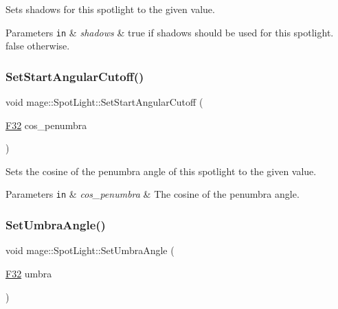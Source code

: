 Sets shadows for this spotlight to the given value.


\begin{DoxyParams}[1]{Parameters}
\mbox{\tt in}  & {\em shadows} & {\ttfamily true} if shadows should be used for this spotlight. {\ttfamily false} otherwise. \\
\hline
\end{DoxyParams}
\hypertarget{classmage_1_1_spot_light_afae0adbfe0da1a897696a90294c93aef}{}\label{classmage_1_1_spot_light_afae0adbfe0da1a897696a90294c93aef} 
\subsubsection{\texorpdfstring{Set\+Start\+Angular\+Cutoff()}{SetStartAngularCutoff()}}
{\footnotesize\ttfamily void mage\+::\+Spot\+Light\+::\+Set\+Start\+Angular\+Cutoff (\begin{DoxyParamCaption}\item[{\hyperlink{namespacemage_aa97e833b45f06d60a0a9c4fc22ae02c0}{F32}}]{cos\+\_\+penumbra }\end{DoxyParamCaption})\hspace{0.3cm}{\ttfamily [noexcept]}}

Sets the cosine of the penumbra angle of this spotlight to the given value.


\begin{DoxyParams}[1]{Parameters}
\mbox{\tt in}  & {\em cos\+\_\+penumbra} & The cosine of the penumbra angle. \\
\hline
\end{DoxyParams}
\hypertarget{classmage_1_1_spot_light_aab2685ef31177d7e40ef964fb9bc0e24}{}\label{classmage_1_1_spot_light_aab2685ef31177d7e40ef964fb9bc0e24} 
\subsubsection{\texorpdfstring{Set\+Umbra\+Angle()}{SetUmbraAngle()}}
{\footnotesize\ttfamily void mage\+::\+Spot\+Light\+::\+Set\+Umbra\+Angle (\begin{DoxyParamCaption}\item[{\hyperlink{namespacemage_aa97e833b45f06d60a0a9c4fc22ae02c0}{F32}}]{umbra }\end{DoxyParamCaption})\hspace{0.3cm}{\ttfamily [noexcept]}}


